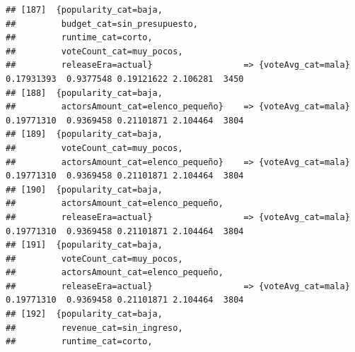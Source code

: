 \documentclass[
]{article}
\begin{document}
\begin{verbatim}
## [187]  {popularity_cat=baja,                                                                                                    
##         budget_cat=sin_presupuesto,                                                                                             
##         runtime_cat=corto,                                                                                                      
##         voteCount_cat=muy_pocos,                                                                                                
##         releaseEra=actual}                  => {voteAvg_cat=mala}                0.17931393  0.9377548 0.19121622 2.106281  3450
## [188]  {popularity_cat=baja,                                                                                                    
##         actorsAmount_cat=elenco_pequeño}    => {voteAvg_cat=mala}                0.19771310  0.9369458 0.21101871 2.104464  3804
## [189]  {popularity_cat=baja,                                                                                                    
##         voteCount_cat=muy_pocos,                                                                                                
##         actorsAmount_cat=elenco_pequeño}    => {voteAvg_cat=mala}                0.19771310  0.9369458 0.21101871 2.104464  3804
## [190]  {popularity_cat=baja,                                                                                                    
##         actorsAmount_cat=elenco_pequeño,                                                                                        
##         releaseEra=actual}                  => {voteAvg_cat=mala}                0.19771310  0.9369458 0.21101871 2.104464  3804
## [191]  {popularity_cat=baja,                                                                                                    
##         voteCount_cat=muy_pocos,                                                                                                
##         actorsAmount_cat=elenco_pequeño,                                                                                        
##         releaseEra=actual}                  => {voteAvg_cat=mala}                0.19771310  0.9369458 0.21101871 2.104464  3804
## [192]  {popularity_cat=baja,                                                                                                    
##         revenue_cat=sin_ingreso,                                                                                                
##         runtime_cat=corto,                                                                                                      

\end{verbatim}
\end{document}
